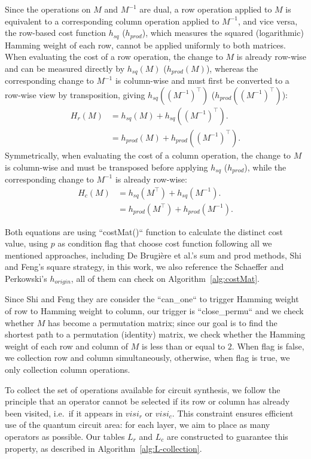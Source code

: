 Since the operations on $M$ and $M^{-1}$ are dual, a row operation
applied to $M$ is equivalent to a corresponding column operation applied to
$M^{-1}$, and vice versa, the row-based cost function $h_{sq}$
($h_{prod}$), which measures the squared (logarithmic) Hamming weight of
each row, cannot be applied uniformly to both matrices. When
evaluating the cost of a row operation, the change to $M$ is already
row-wise and can be measured directly by $h_{sq}(M)$ ($h_{prod}(M)$), 
whereas the corresponding change to $M^{-1}$ is column-wise and
must first be converted to a row-wise view by transposition, giving
$h_{sq}((M^{-1})^{\top})$ ($h_{prod}((M^{-1})^{\top})$):
\begin{align}
	H_{r}(M) &= h_{sq}(M) + h_{sq}\!\left((M^{-1})^{\top}\right).\\
             &= h_{prod}(M) + h_{prod}\!\left((M^{-1})^{\top}\right).
\end{align}
Symmetrically, when evaluating the cost of a column operation, the change to
$M$ is column-wise and must be transposed before applying $h_{sq}$ ($h_{prod}$), while
the corresponding change to $M^{-1}$ is already row-wise:
\begin{align}
	H_{c}(M) &= h_{sq}(M^{\top}) + h_{sq}(M^{-1}).\\
             &= h_{prod}(M^{\top}) + h_{prod}(M^{-1}).
\end{align}

Both equations are using ``costMat()`` function to calculate the 
distinct cost value, using $p$ as condition flag that choose cost 
function following all we mentioned approaches, including De 
Brugière et al.'s sum and prod methods, Shi and Feng's square strategy, 
in this work, we also reference the Schaeffer and Perkowski's $h_{origin}$, 
all of them can check on Algorithm~\ref{alg:costMat}.

Since Shi and Feng they are consider the ``can\_one`` to trigger 
Hamming weight of row to Hamming weight to column, our trigger is 
``close\_permu`` and we check whether $M$ has become a permutation 
matrix; since our goal is to find the shortest path to a permutation 
(identity) matrix, we check whether the Hamming weight of each row 
and column of $M$ is less than or equal to $2$. When flag is false, 
we collection row and column simultaneously, otherwise, when flag is 
true, we only collection column operations.

To collect the set of operations available for circuit synthesis, 
we follow the principle that an operator cannot be selected if its 
row or column has already been visited, i.e.\ if it appears in 
$visi_{r}$ or $visi_{c}$. This constraint ensures efficient 
use of the quantum circuit area: for each layer, we aim to place 
as many operators as possible. Our tables $L_r$ and $L_c$ are constructed 
to guarantee this property, as described in Algorithm~\ref{alg:L-collection}.

